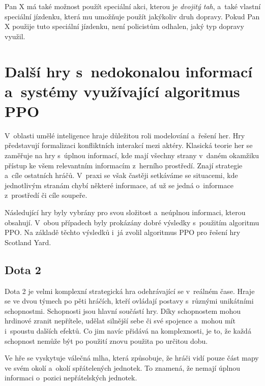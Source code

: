 Pan X má také možnost použít speciální akci, kterou je \emph{dvojitý tah}, a~také vlastní speciální jízdenku, která mu umožňuje použít jakýkoliv druh dopravy.
Pokud Pan X použije tuto speciální jízdenku, není policistům odhalen, jaký typ dopravy využil.

\section{Další hry s~nedokonalou informací a~systémy využívající algoritmus PPO}\label{sec:dalsi-hry-s-nedokonalou-informaci}
V~oblasti umělé inteligence hraje důležitou roli modelování a~řešení her.
Hry představují formalizaci konfliktních interakcí mezi aktéry.
Klasická teorie her se zaměřuje na hry s~úplnou informací, kde mají všechny strany v~daném okamžiku přístup ke všem relevantním informacím z~herního prostředí.
Znají strategie a~cíle ostatních hráčů.
V~praxi se však častěji setkáváme se situacemi, kde jednotlivým stranám chybí některé informace, ať už se jedná o~informace z~prostředí či cíle soupeře.

Následující hry byly vybrány pro svou složitost a~neúplnou informaci, kterou obsahují.
V~obou případech byly prokázány dobré výsledky s~použitím algoritmu PPO.
Na základě těchto výsledků i~já zvolil algoritmus PPO pro řešení hry Scotland Yard.

\subsection{Dota 2}\label{subsec:dota}
Dota 2 je velmi komplexní strategická hra odehrávající se v~reálném čase.
Hraje se ve dvou týmech po pěti hráčích, kteří ovládají postavy s~různými unikátními schopnostmi.
Schopnosti jsou hlavní součástí hry.
Díky schopnostem mohou hrdinové zranit nepřítele, udělat silnější sebe či své spojence a~mohou mít i~spoustu dalších efektů.
Co jim navíc přidává na komplexnosti, je to, že každá schopnost nemůže být po použití znovu použita po určitou dobu.

Ve hře se vyskytuje válečná mlha, která způsobuje, že hráči vidí pouze část mapy ve svém okolí a~okolí spřátelených jednotek.
To znamená, že nemají úplnou informaci o~pozici nepřátelských jednotek.

\bigskip

